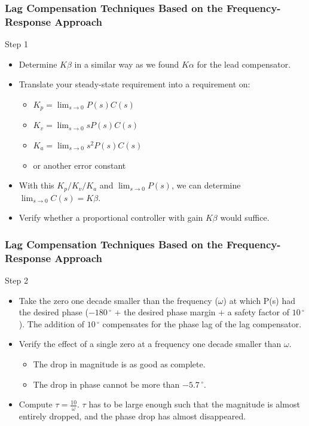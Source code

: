 \begin{frame}
\frametitle{Lag Compensation Techniques Based on the Frequency-Response Approach}
\begin{block}{Step 1}
	\begin{itemize}
	\item Determine $K\beta$ in a similar way as we found $K\alpha$ for the lead compensator.
	\item Translate your steady-state requirement into a requirement on:
	\begin{itemize}
		\item $K_p = \lim_{s \to 0} P(s)C(s)$
		\item $K_v = \lim_{s \to 0} sP(s)C(s)$
		\item $K_a = \lim_{s \to 0} s^2P(s)C(s)$
		\item or another error constant
	\end{itemize}
	\item With this $K_p/K_v/K_a$ and $\lim_{s \to 0} P(s)$, we can determine $\lim_{s \to 0}C(s) = K\beta$.
	\item Verify whether a proportional controller with gain $K\beta$ would suffice.
	\end{itemize}
\end{block}
\end{frame}

\begin{frame}
\frametitle{Lag Compensation Techniques Based on the Frequency-Response Approach}
\begin{block}{Step 2}
	\begin{itemize}
	\item Take the zero one decade smaller than the frequency ($\omega$) at which P(s) had the desired phase ($-180\,^{\circ}$ + the desired phase margin + a safety factor of $10\,^{\circ}$). The addition of $10\,^{\circ}$ compensates for the phase lag of the lag compensator.
	\item Verify the effect of a single zero at a frequency one decade smaller than $\omega$.
	\begin{itemize}
		\item The drop in magnitude is as good as complete.
		\item The drop in phase cannot be more than $-5.7\,^{\circ}$.
	\end{itemize}
	\item Compute $\tau = \frac{10}{\omega}$. $\tau$ has to be large enough such that the magnitude is almost entirely dropped, and the phase drop has almost disappeared.
	\end{itemize}
\end{block}
\end{frame}

